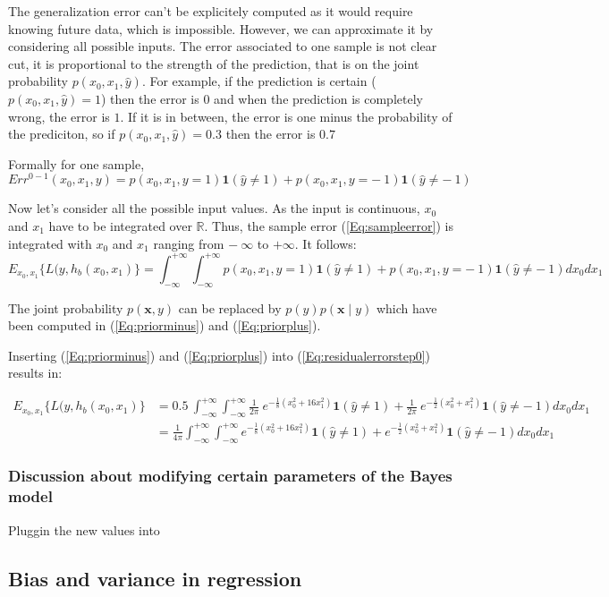 \documentclass{article}
\begin{document}
The generalization error can't be explicitely computed as it would require knowing future data, which is impossible. However, we can approximate it by considering all possible inputs.
The error associated to one sample is not clear cut, it is proportional to the strength of the prediction, that is on the joint probability $p(x_0,x_1,\hat{y})$.
For example, if the prediction is certain ($p(x_0,x_1,\hat{y}) = 1$) then the error is $0$ and when the prediction is completely wrong, the error is $1$.
If it is in between, the error is one minus the probability of the prediciton, so if $p(x_0,x_1,\hat{y}) = 0.3$ then the error is $0.7$

Formally for one sample, 
\begin{equation}
    Err^{0-1}(x_0,x_1,y) = p(x_0,x_1,y = 1)\textbf{1}(\hat{y} \ne 1) + p(x_0,x_1,y =-\ 1)\textbf{1}(\hat{y} \ne -\ 1)
    \label{Eq:sampleerror}
\end{equation}

Now let's consider all the possible input values. As the input is continuous, $x_0$ and $x_1$ have to be integrated over $\mathbb{R}$.
Thus, the sample error (\ref{Eq:sampleerror}) is integrated with $x_0$ and $x_1$ ranging from $-\ \infty$ to $+\infty$.
It follows:
\begin{equation}
    E_{x_0, x_1}\{L(y,h_b(x_0,x_1)\} =  \int_{-\infty}^{+\infty} \int_{-\infty}^{+\infty}p(x_0,x_1,y = 1)\textbf{1}(\hat{y} \ne 1) + p(x_0,x_1,y =-\ 1)\textbf{1}(\hat{y} \ne -\ 1) dx_0 dx_1
\label{Eq:residualerrorstep0}
\end{equation}

The joint probability $p(\boldsymbol{x}, y)$ can be replaced by $p(y)p(\boldsymbol{x} \mid y)$ which have been computed in (\ref{Eq:priorminus}) and (\ref{Eq:priorplus}).

Inserting (\ref{Eq:priorminus}) and (\ref{Eq:priorplus}) into (\ref{Eq:residualerrorstep0}) results in:

\begin{equation}
\begin{aligned}
    E_{x_0, x_1}\{L(y,h_b(x_0,x_1)\} &= 0.5 \  \int_{-\infty}^{+\infty} \int_{-\infty}^{+\infty}\frac{1}{2\pi}\ e^{-\frac{1}{8}(x_0^2 + 16x_1^2)} \textbf{1}(\hat{y} \ne 1) + \frac{1}{2\pi}\ e^{-\frac{1}{2}(x_0^2 + x_1^2)} \textbf{1}(\hat{y} \ne -\ 1) dx_0 dx_1 \\
    &= \frac{1}{4\pi} \int_{-\infty}^{+\infty} \int_{-\infty}^{+\infty} e^{-\frac{1}{8}(x_0^2 + 16x_1^2)} \textbf{1}(\hat{y} \ne 1) + e^{-\frac{1}{2}(x_0^2 + x_1^2)} \textbf{1}(\hat{y} \ne -\ 1) dx_0 dx_1
    
\end{aligned}
\label{Eq:residualerrorstep1}
\end{equation}


\subsubsection{Discussion about modifying certain parameters of the Bayes model}
Pluggin the new values into

\subsection{Bias and variance in regression}
\end{document}
